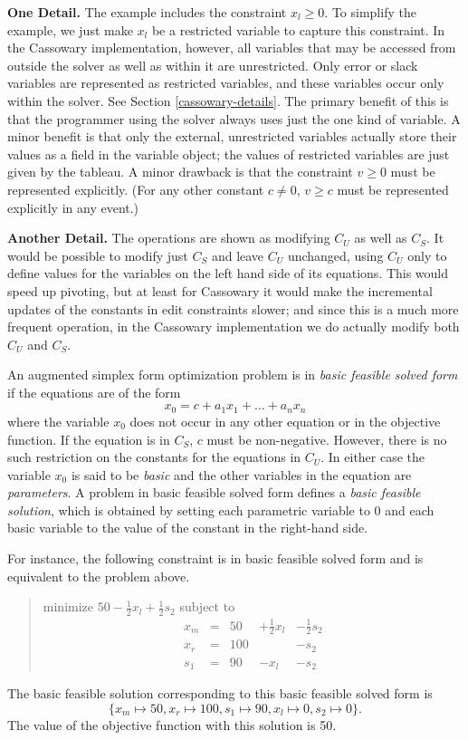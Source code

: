 \documentclass{article}
\begin{document}
{\bf One Detail.}  The example includes the constraint $x_l \geq 0$.  To
simplify the example, we just make $x_l$ be a restricted variable to
capture this constraint.  In the Cassowary implementation, however, all
variables that may be accessed from outside the solver as well as within it
are unrestricted.  Only error or slack variables are represented as
restricted variables, and these variables occur only within the solver.
See Section \ref{cassowary-details}.  The primary benefit of this is
that the programmer using the solver always uses just the one kind of
variable.  A minor benefit is that only the external, unrestricted
variables actually store their values as a field in the variable object;
the values of restricted variables are just given by the tableau.  A minor
drawback is that the constraint $v \geq 0$ must be represented explicitly.
(For any other constant $c \neq 0$, $v \geq c$ must be represented
explicitly in any event.)

{\bf Another Detail.}  The operations are shown as modifying $C_U$ as well
as $C_S$\@.  It would be possible to modify just $C_S$ and leave $C_U$
unchanged, using $C_U$ only to define values for the variables on the left
hand side of its equations.  This would speed up pivoting, but at least for
Cassowary it would make the incremental updates of the constants in edit
constraints slower; and since this is a much more frequent operation, in
the Cassowary implementation we do actually modify both $C_U$ and $C_S$\@.

An augmented simplex form optimization problem is in 
\emph{basic feasible solved form} if the equations are of the form 
$$x_0 = c + a_1 x_1 + \ldots + a_n x_n$$ where the variable $x_0$ does not
occur in any other equation or in the objective function.  If the equation
is in $C_S$, $c$ must be non-negative.  However, there is no
such restriction on the constants for the equations in $C_U$\@.  In either
case the variable $x_0$ is said to be \emph{basic} and the other
variables in the equation are \emph{parameters}.  A problem in basic
feasible solved form defines a \emph{basic feasible solution}, which is
obtained by setting each parametric variable to 0 and each basic variable
to the value of the constant in the right-hand side.

For instance, the following constraint
is in basic feasible solved form and is equivalent to the 
problem above.
\begin{quote}\vspace*{-1ex}
minimize $50 - \frac{1}{2} x_l + \frac{1}{2} s_2 $ 
subject to 
$$
\begin{array}{rlrrr} 
x_m & = &50 & + \frac{1}{2} x_l & - \frac{1}{2} s_2 \\
x_r & = &100 &  & - s_2 \\ \hline
s_1 & = &90 & - x_l &  - s_2 
\end{array}
$$
\end{quote}\vspace{-0.9ex}
The basic feasible solution corresponding to this
basic feasible solved form is 
$$\{x_m \mapsto 50, x_r \mapsto 100, s_1 \mapsto 90, x_l \mapsto 0, 
s_2 \mapsto 0\}.$$
The value of the objective function with this solution is 50.
\end{document}

